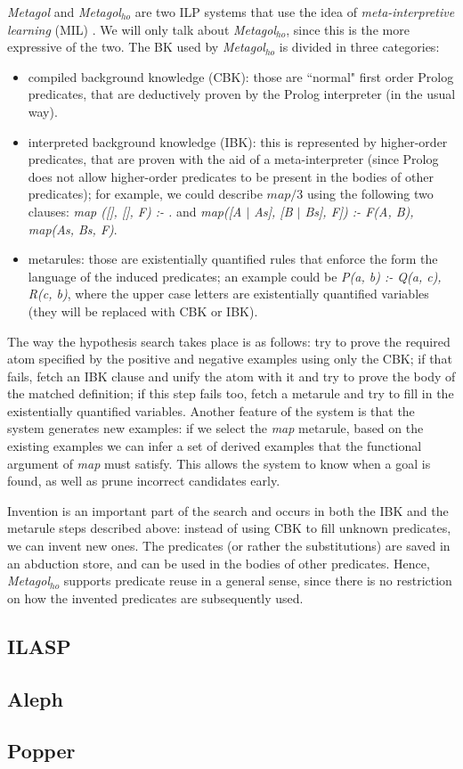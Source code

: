\emph{Metagol} and \emph{Metagol$_{ho}$} \cite{metagolho} are two ILP systems that use the idea of \emph{meta-interpretive learning} (MIL) \cite{invabs2016}. We will only talk about \emph{Metagol$_{ho}$}, since this is the more expressive of the two. The BK used by \emph{Metagol$_{ho}$} is divided in three categories:
\begin{itemize}
\item compiled background knowledge (CBK): those are ``normal" first order Prolog predicates, that are deductively proven by the Prolog interpreter (in the usual way).
\item interpreted background knowledge (IBK): this is represented by higher-order predicates, that are proven with the aid of a meta-interpreter (since Prolog does not allow higher-order predicates to be present in the bodies of other predicates); for example, we could describe $map/3$ using the following two clauses:
\textit{map ([], [], F) :- .} and \textit{map([A $\mid$ As], [B $\mid$ Bs], F]) :- F(A, B), map(As, Bs, F)}.
\item metarules: those are existentially quantified rules that enforce the form the language of the induced predicates; an example could be \textit{P(a, b) :- Q(a, c), R(c, b)}, where the upper case letters are existentially quantified variables (they will be replaced with CBK or IBK).
\end{itemize}
The way the hypothesis search takes place is as follows: try to prove the required atom specified by the positive and negative examples using only the CBK; if that fails, fetch an IBK clause and unify the atom with it and try to prove the body of the matched definition; if this step fails too, fetch a metarule and try to fill in the existentially quantified variables. Another feature of the system is that the system generates new examples: if we select the \textit{map} metarule, based on the existing examples we can infer a set of derived examples that the functional argument of \textit{map} must satisfy. This allows the system to know when a goal is found, as well as prune incorrect candidates early.
\par Invention is an important part of the search and occurs in both the IBK and the metarule steps described above: instead of using CBK to fill unknown predicates, we can invent new ones. The predicates (or rather the substitutions) are saved in an abduction store, and can be used in the bodies of other predicates. Hence, \emph{Metagol$_{ho}$} supports predicate reuse in a general sense, since there is no restriction on how the invented predicates are subsequently used.

\subsection{ILASP}

\subsection{Aleph}

\subsection{Popper}
